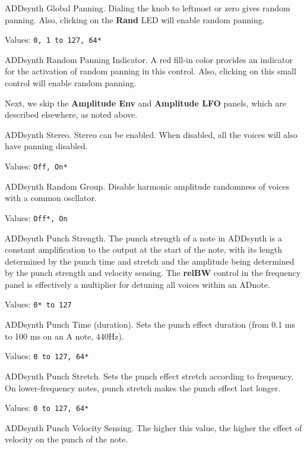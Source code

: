    ADDsynth Global Panning.
   Dialing the knob to leftmost or zero gives random panning.
   Also, clicking on the \textbf{Rand} LED will enable random panning.

   Values: \texttt{0, 1 to 127, 64*}

   ADDsynth Random Panning Indicator.
   A red fill-in color provides an indicator for the activation of random
   panning in this control.
   Also, clicking on this small control will enable random panning.

   Next, we skip the \textbf{Amplitude Env} and \textbf{Amplitude LFO}
   panels, which are described elsewhere, as noted above.

   ADDsynth Stereo.
   Stereo can be enabled.
   When disabled, all the voices will also have panning disabled.

   Values: \texttt{Off, On*}

   ADDsynth Random Group.
   Disable harmonic amplitude randomness of voices with a common oscllator.

   Values: \texttt{Off*, On}

   ADDsynth Punch Strength.
   The punch strength of a note in ADDsynth is a constant amplification to
   the output at the start of the note, with its length determined by the
   punch time and stretch and the amplitude being determined by the punch
   strength and velocity sensing. The \textbf{relBW}
   control in the frequency panel is
   effectively a multiplier for detuning all voices within an ADnote.

   Values: \texttt{0* to 127}

   ADDsynth Punch Time (duration).
   Sets the punch effect duration (from 0.1 ms to 100 ms on an A note, 440Hz).

   Values: \texttt{0 to 127, 64*}

   ADDsynth Punch Stretch.
   Sets the punch effect stretch according to frequency. On lower-frequency
   notes, punch stretch makes the punch effect last longer.

   Values: \texttt{0 to 127, 64*}

   ADDsynth Punch Velocity Sensing.
   The higher this value, the higher the effect of velocity on the punch of
   the note.

